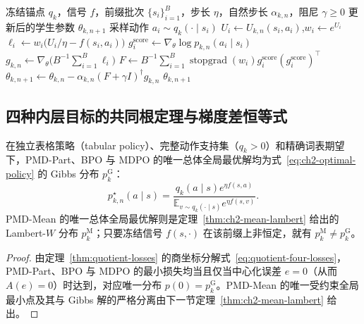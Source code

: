 \documentclass[lang=cn,scheme=chinese,openany]{elegantbook}
\newcommand{\sg}{\operatorname{stopgrad}}
\begin{document}
\begin{algorithm}[ht]
\caption{MDPO 自然梯度内层更新\\{\small\textit{数学语义：最小化固定前缀测度下的负镜像变分目标}}}
\begin{algorithmic}[1]
\Require 冻结锚点 $q_k$，信号 $f$，前缀批次 $\{s_i\}_{i=1}^{B}$，步长 $\eta$，自然步长 $\alpha_{k,n}$，阻尼 $\gamma\ge0$
\Ensure 更新后的学生参数 $\theta_{k,n+1}$
    \State 采样动作 $a_i\sim q_k(\cdot\mid s_i)$
    \State $U_i\gets U_{k,n}(s_i,a_i)$,\quad $w_i\gets e^{U_i}$
    \State $\ell_i\gets w_i\bigl(U_i/\eta-f(s_i,a_i)\bigr)$ 
    \State $g_i^{\mathrm{score}}\gets\nabla_\theta\log p_{k,n}(a_i\mid s_i)$
\EndFor
\State $g_{k,n}\gets\nabla_\theta\bigl(B^{-1}\sum_{i=1}^B\ell_i\bigr)$
\State $F\gets B^{-1}\sum_{i=1}^B\sg(w_i)g_i^{\mathrm{score}}(g_i^{\mathrm{score}})^\top$
\State $\theta_{k,n+1}\gets\theta_{k,n}-\alpha_{k,n}(F+\gamma I)^\dagger g_{k,n}$
\State \Return $\theta_{k,n+1}$
\end{algorithmic}
\end{algorithm}

\subsection{四种内层目标的共同根定理与梯度差恒等式}

\begin{theorem}
\label{thm:ch2-inner-common-root}
在独立表格策略（tabular policy）、完整动作支持集（$q_k>0$）和精确词表期望下，PMD-Part、BPO 与 MDPO 的唯一总体全局最优解均为式~\eqref{eq:ch2-optimal-policy} 的 Gibbs 分布 $p_k^{\mathrm G}$：
\begin{equation}
\label{eq:ch2-four-methods-common-gibbs}
 p_{k,n}^{\star}(a\mid s)
=\frac{ q_k(a\mid s)e^{\eta f(s,a)}}{\mathbb E_{v\sim q_k(\cdot\mid s)}e^{\eta f(s,v)}}.
\end{equation}
PMD-Mean 的唯一总体全局最优解则是定理~\ref{thm:ch2-mean-lambert} 给出的 Lambert-$W$ 分布 $p_k^{\mathrm M}$；只要冻结信号 $f(s,\cdot)$ 在该前缀上非恒定，就有 $p_k^{\mathrm M}\ne p_k^{\mathrm G}$。
\end{theorem}
\begin{proof}
由定理~\ref{thm:quotient-losses} 的商坐标分解式~\eqref{eq:quotient-four-losses}，PMD-Part、BPO 与 MDPO 的最小损失均当且仅当中心化误差 $e=0$（从而 $A(e)=0$）时达到，对应唯一分布 $p(0)=p_k^{\mathrm G}$。PMD-Mean 的唯一受约束全局最小点及其与 Gibbs 解的严格分离由下一节定理~\ref{thm:ch2-mean-lambert} 给出。
\end{proof}
\end{document}
